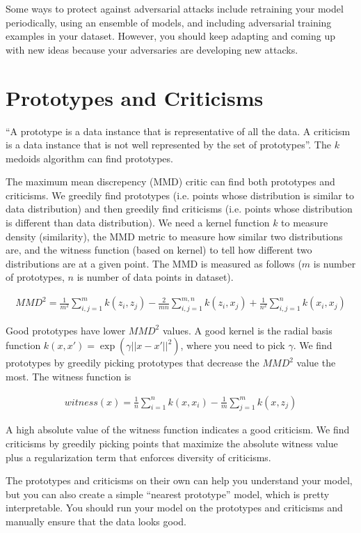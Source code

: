 \documentclass[a4paper]{article}
\begin{document}
Some ways to protect against adversarial attacks include retraining your model
periodically, using an ensemble of models, and including adversarial training
examples in your dataset. However, you should keep adapting and coming up with
new ideas because your adversaries are developing new attacks.

\section{Prototypes and Criticisms}
``A prototype is a data instance that is representative of all the data. A criticism is a data instance that is not well represented by the set of
prototypes''. The $k$ medoids algorithm can find prototypes.

The maximum mean discrepency (MMD) critic can find both prototypes and
criticisms. We greedily find prototypes (i.e. points whose distribution is
similar to data distribution) and then greedily find criticisms (i.e. points
whose distribution is different than data distribution). We need a kernel
function $k$ to measure density (similarity), the MMD metric to measure how
similar two distributions are, and the witness function (based on kernel) to
tell how different two distributions are at a given point. The MMD is measured
as follows ($m$ is number of prototypes, $n$ is number of data points in
dataset).

\begin{align}
  MMD^2 = \frac{1}{m^2} \sum_{i,j=1}^{m}{k(z_i, z_j)} - \frac{2}{mn}
  \sum_{i,j=1}^{m,n}{k(z_i, x_j)} + \frac{1}{n^2} \sum_{i,j=1}^{n}{k(x_i, x_j)}
\end{align}

Good prototypes have lower $MMD^2$ values. A good kernel is the radial basis
function
$k(x, x') = \exp(\gamma ||x - x'||^2)$, where you need to pick $\gamma$. We
find prototypes by greedily picking prototypes that decrease the $MMD^2$ value
the most. The witness function is

\begin{align}
  witness(x) = \frac{1}{n} \sum_{i=1}^{n}{k(x, x_i)}
  - \frac{1}{m} \sum_{j=1}^{m}{k(x, z_j)}
\end{align}

A high absolute value of the witness function indicates a good criticism. We
find criticisms by greedily picking points that maximize the absolute witness
value plus a regularization term that enforces diversity of criticisms.

The prototypes and criticisms on their own can help you understand your model,
but you can also create a simple ``nearest prototype'' model, which is pretty
interpretable. You should run your model on the prototypes and criticisms and
manually ensure that the data looks good.
\end{document}
